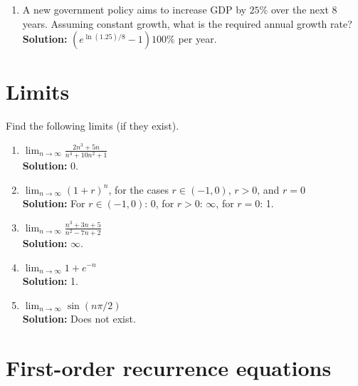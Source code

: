 \documentclass{article}
\begin{document}
\begin{enumerate}[leftmargin = 0.5cm, label = \arabic*., rightmargin = 0.2cm]
\begin{enumerate}[leftmargin = 0.5cm, label = (\alph*), rightmargin = 0.2cm]
        \item $1, -1, 1, -1, 1, \dots$ \\
        \textbf{Solution:} $a_n = (-1)^(n+1)$, no limit.
    \end{enumerate}

    \item A new government policy aims to increase GDP by $25\%$ over the next $8$ years. Assuming constant growth, what is the required annual growth rate? \\
    \textbf{Solution:} $(e^{\ln(1.25)/8} - 1)100\%$ per year.

\end{enumerate}

\section{Limits}

Find the following limits (if they exist).

\begin{enumerate}[leftmargin = 0.5cm, label = (\alph*), rightmargin = 0.2cm]

    \item $\lim_{n\rightarrow\infty} \frac{2n^3 + 5n}{n^4 + 10n^2 + 1}$ \\
    \textbf{Solution:} 0.

    \item $\lim_{n\rightarrow\infty} (1+r)^n$, for the cases $r \in (-1, 0)$, $r > 0$, and $r = 0$ \\
    \textbf{Solution:} For $r \in (-1, 0)$: 0, for $r > 0$: $\infty$, for $r = 0$: 1.

    \item $\lim_{n\rightarrow\infty} \frac{n^3 + 3n + 5}{n^2 - 7n + 2}$ \\
    \textbf{Solution:} $\infty$.

    \item $\lim_{n \to \infty} 1 + e^{-n}$ \\
    \textbf{Solution:} 1.

    \item $\lim_{n \to \infty} \sin(n\pi/2)$ \\
    \textbf{Solution:} Does not exist.

\end{enumerate}

\section{First-order recurrence equations}
\end{document}
